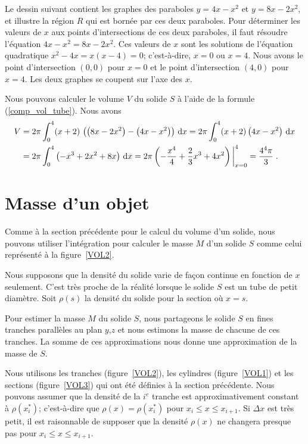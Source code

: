 {\begin{egg}
Le dessin suivant contient les graphes des paraboles $y=4x-x^2$
et $y=8x-2x^2$, et illustre la région $R$ qui est bornée par ces
deux paraboles.
Pour déterminer les valeurs de $x$ aux points d'intersections de ces
deux paraboles, il faut résoudre l'équation $4x-x^2 = 8x-2x^2$.
Ces valeurs de $x$ sont les solutions de l'équation quadratique
$x^2 - 4x = x(x-4)=0$; c'est-à-dire, $x=0$ ou $x=4$.  Nous avons le point
d'intersection $(0,0)$ pour $x=0$ et le point d'intersection
$(4,0)$ pour $x=4$.  Les deux graphes se coupent sur l'axe des $x$.

Nous pouvons calculer le volume $V$ du solide $S$ à l'aide de la formule
(\ref{comp_vol_tube}).  Nous avons
\begin{align*}
V &= 2 \pi \int_0^4 (x+2) \, \left( \left(8x-2x^2\right) -
\left(4x-x^2\right)\right) \,\mathrm{d}x =
2\pi \int_0^4 (x+2) \left( 4x-x^2 \right) \,\mathrm{d}x \\
&= 2\pi \int_0^4 \left( -x^3 +2x^2 +8x \right) \,\mathrm{d}x
= 2\pi \left(-\frac{x^4}{4} + \frac{2}{3} x^3 + 4x^2 \right)\bigg|_{x=0}^4 =
\frac{4^4\pi}{3} \; .
\end{align*}
\end{egg}

\section{Masse d'un objet \eng}

Comme à la section précédente pour le calcul du volume d'un solide,
nous pouvons utiliser l'intégration pour calculer le masse $M$ d'un
solide $S$ comme celui représenté à la figure~\ref{VOL2}.

Nous supposons que la densité du solide varie de façon continue en fonction de
$x$ seulement.  C'est très proche de la réalité lorsque le solide $S$ est un
tube de petit diamètre.  Soit $\rho(s)$ la densité du solide pour la section
où $x=s$.

Pour estimer la masse $M$ du solide $S$, nous partageons le solide $S$
en fines tranches parallèles au plan $y$,$z$ et nous estimons la masse
de chacune de ces tranches. La somme de ces approximations nous donne
une approximation de la masse de $S$.

Nous utilisons les tranches (figure~\ref{VOL2}), les cylindres
(figure~\ref{VOL1}) et les sections (figure~\ref{VOL3}) qui
ont été définies à la section précédente. Nous pouvons assumer que la
densité de la $i^e$ tranche est approximativement constant à
$\rho(x_i^\ast)$; c'est-à-dire que $\rho(x) = \rho(x_i^\ast)$ pour
$x_i \leq x \leq x_{i+1}$.  Si $\Delta x$ est très petit, il est
raisonnable de supposer que la densité $\rho(x)$ ne changera presque
pas pour $x_i \leq x \leq x_{i+1}$.

}
